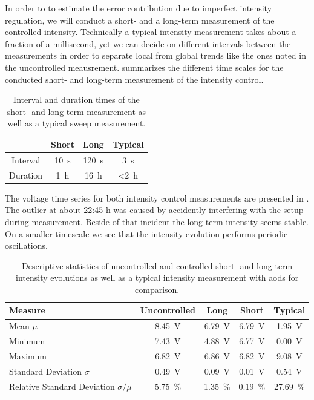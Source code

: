 In order to to estimate the error contribution due to imperfect intensity
regulation, we will conduct a short- and a long-term measurement of the
controlled intensity. Technically a typical intensity measurement takes about
a fraction of a millisecond, yet we can decide on different intervals between
the measurements in order to separate local from global trends like the ones
noted in the uncontrolled meausrement. 
summarizes the different time scales for the conducted short- and long-term
measurement of the intensity control.
\begin{table}[htb]
  \centering
  \begin{tabular}{cccc}
    \toprule
    & Short & Long & Typical \\
    \midrule
    Interval &
    \SI{10}{\second} &
    \SI{120}{\second} &
    \SI{3}{\second} \\
    Duration &
    \SI{1}{\hour} &
    \SI{16}{\hour} &
    \SI{<2}{\hour} \\
    \bottomrule
  \end{tabular}
  \caption{Interval and duration times of the short- and long-term measurement
    as well as a typical sweep measurement.
  }\label{tab:intensity_control_times}
\end{table}
The voltage time series for both intensity control measurements are presented
in . The outlier at about 22:45 h was caused by
accidently interfering with the setup during measurement. Beside of that
incident the long-term intensity seems stable. On a smaller timescale we see
that the intensity evolution performs periodic oscillations.
\begin{table}[htb]
  \centering
  \begin{tabular}{lcccc}
    \toprule
    Measure & Uncontrolled & Long & Short & Typical \\
    \midrule
    Mean $\mu$ &
    \SI{8.45}{\volt} &
    \SI{6.79}{\volt} &
    \SI{6.79}{\volt} &
    \SI{1.95}{\volt} \\
    Minimum &
    \SI{7.43}{\volt} &
    \SI{4.88}{\volt} &
    \SI{6.77}{\volt} &
    \SI{0.00}{\volt} \\
    Maximum &
    \SI{6.82}{\volt} &
    \SI{6.86}{\volt} &
    \SI{6.82}{\volt} &
    \SI{9.08}{\volt} \\
    Standard Deviation $\sigma$ &
    \SI{0.49}{\volt} &
    \SI{0.09}{\volt} &
    \SI{0.01}{\volt} &
    \SI{0.54}{\volt} \\
    Relative Standard Deviation $\sigma/\mu$ &
    \SI{5.75}{\percent} &
    \SI{1.35}{\percent} &
    \SI{0.19}{\percent} &
    \SI{27.69}{\percent} \\
    \bottomrule
  \end{tabular}
  \caption{Descriptive statistics of uncontrolled and controlled short- and
    long-term intensity evolutions as well as a typical intensity measurement
    with \gls{aod}s for comparison.
  }\label{tab:intensity_control_statistics}
\end{table}
